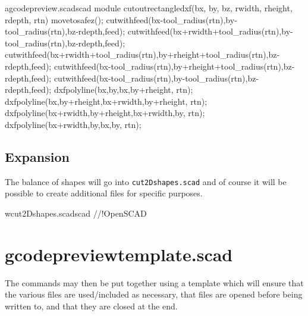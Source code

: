 \documentclass{ltxdoc}
\begin{document}
\lstset{firstnumber=\thegcpscad}
\begin{writecode}{a}{gcodepreview.scad}{scad}
module cutoutrectangledxf(bx, by, bz, rwidth, rheight, rdepth, rtn) {
  movetosafez();
  cutwithfeed(bx-tool_radius(rtn),by-tool_radius(rtn),bz-rdepth,feed);
  cutwithfeed(bx+rwidth+tool_radius(rtn),by-tool_radius(rtn),bz-rdepth,feed);
  cutwithfeed(bx+rwidth+tool_radius(rtn),by+rheight+tool_radius(rtn),bz-rdepth,feed);
  cutwithfeed(bx-tool_radius(rtn),by+rheight+tool_radius(rtn),bz-rdepth,feed);
  cutwithfeed(bx-tool_radius(rtn),by-tool_radius(rtn),bz-rdepth,feed);
  dxfpolyline(bx,by,bx,by+rheight, rtn);
  dxfpolyline(bx,by+rheight,bx+rwidth,by+rheight, rtn);
  dxfpolyline(bx+rwidth,by+rheight,bx+rwidth,by, rtn);
  dxfpolyline(bx+rwidth,by,bx,by, rtn);
}

\end{writecode}
\addtocounter{gcpscad}{13}

\subsection{Expansion}

The balance of shapes will go into \texttt{cut2Dshapes.scad} and of course it will be 
possible to create additional files for specific purposes.

\lstset{firstnumber=1}
\begin{writecode}{w}{cut2Dshapes.scad}{scad}
//!OpenSCAD

\end{writecode}
\addtocounter{cuttwod}{2}

\section{gcodepreviewtemplate.scad}

The commands may then be put together using a template which will ensure that
the various files are used/included as necessary, that files are opened before
being written to, and that they are closed at the end.

%
%
%
%
%
\end{document}
